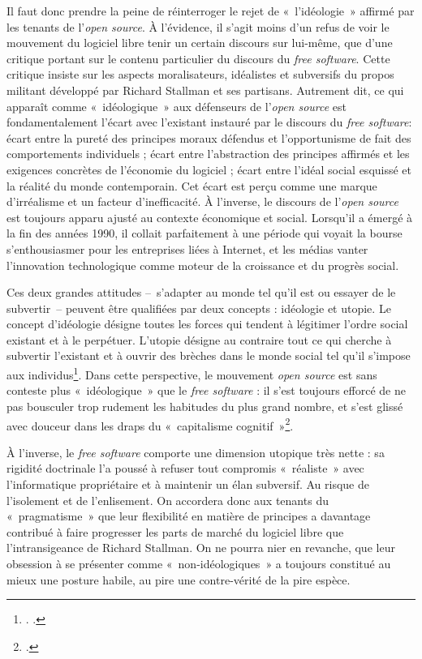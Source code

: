 \documentclass{FramateX}
\begin{document}
\begin{refsection}
Il faut donc prendre la peine de réinterroger le rejet de
«~l'idéologie~» affirmé par les tenants de l'\textit{open source}. À
l'évidence, il s'agit moins d'un refus de voir le mouvement du logiciel
libre tenir un certain discours sur lui-même, que d'une critique
portant sur le contenu particulier du discours du \textit{free
software}. Cette critique insiste sur les aspects moralisateurs,
idéalistes et subversifs du propos militant développé par Richard
Stallman et ses partisans. Autrement dit, ce qui apparaît comme
«~idéologique~» aux défenseurs de l'\textit{open source} est
fondamentalement l'écart avec l'existant instauré par le discours du
\textit{free software}: écart entre la pureté des principes moraux
défendus et l'opportunisme de fait des comportements individuels ;
écart entre l'abstraction des principes affirmés et les exigences
concrètes de l'économie du logiciel ; écart entre l'idéal social
esquissé et la réalité du monde contemporain. Cet écart est perçu comme
une marque d'irréalisme et un facteur d'inefficacité. À l'inverse, le
discours de l'\textit{open source} est toujours apparu ajusté au
contexte économique et social. Lorsqu'il a émergé à la fin des années
1990, il collait parfaitement à une période qui voyait la bourse
s'enthousiasmer pour les entreprises liées à Internet, et les médias
vanter l'innovation technologique comme moteur de la croissance et du
progrès social. 

Ces deux grandes attitudes –~s'adapter au monde tel
qu'il est ou essayer de le subvertir~– peuvent être
qualifiées par deux concepts : idéologie et utopie. Le concept
d'idéologie désigne toutes les forces qui tendent à
légitimer l'ordre social existant et à le perpétuer.
L'utopie désigne au contraire tout ce qui cherche à
subvertir l'existant et à ouvrir des brèches dans le
monde social tel qu'il s'impose aux
individus\footnote{\cite{mannheimideologie2006}. \cite{ricoeurideologie1997}.}. Dans cette perspective, le mouvement
\textit{open source} est sans conteste plus «~idéologique~» que le
\textit{free software} : il s'est toujours efforcé de
ne pas bousculer trop rudement les habitudes du plus grand nombre, et
s'est glissé avec douceur dans les draps du
«~capitalisme cognitif~»\footnote{\cite{moulierboutangcapitalisme2007}.}.

À l'inverse, le \textit{free software} comporte une
dimension utopique très nette : sa rigidité doctrinale
l'a poussé à refuser tout compromis «~réaliste~» avec
l'informatique propriétaire et à maintenir un élan
subversif. Au risque de l'isolement et de
l'enlisement. On accordera donc aux tenants du
«~pragmatisme~» que leur flexibilité en matière de principes a
davantage contribué à faire progresser les parts de marché du logiciel
libre que l'intransigeance de Richard Stallman. On ne pourra nier en
revanche, que leur obsession à se présenter comme «~non-idéologiques~»
a toujours constitué au mieux une posture habile, au pire une
contre-vérité de la pire espèce. 



\end{refsection}
\end{document}
